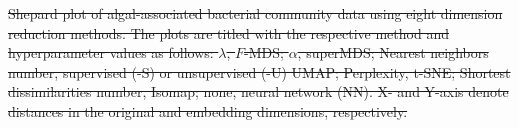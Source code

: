 \documentclass[11pt]{article}
\newcommand{\1}{{\rm 1}\kern-0.24em{\rm I}}
\providecommand{\DIFdeltex}[1]{{\protect\color{red}\sout{#1}}}                      %
\providecommand{\DIFdelbegin}{} %
\providecommand{\DIFdelend}{} %
\providecommand{\DIFdelFL}[1]{\DIFdel{#1}} %
\providecommand{\DIFdel}[1]{\texorpdfstring{\DIFdeltex{#1}}{}} %
\newcommand{\DIFscaledelfig}{0.5}
\newlength{\DIFdelgraphicswidth} %
\newlength{\DIFdelgraphicsheight} %
\newcommand{\DIFdelincludegraphics}[2][]{%
\sbox{\DIFdelgraphicsbox}{\DIFOincludegraphics[#1]{#2}}%
\settoboxwidth{\DIFdelgraphicswidth}{\DIFdelgraphicsbox} %
\settoboxtotalheight{\DIFdelgraphicsheight}{\DIFdelgraphicsbox} %
\scalebox{\DIFscaledelfig}{%
\parbox[b]{\DIFdelgraphicswidth}{\usebox{\DIFdelgraphicsbox}\\[-\baselineskip] \rule{\DIFdelgraphicswidth}{0em}}\llap{\resizebox{\DIFdelgraphicswidth}{\DIFdelgraphicsheight}{%
\setlength{\unitlength}{\DIFdelgraphicswidth}%
\begin{picture}(1,1)%
\thicklines\linethickness{2pt} %
{\color[rgb]{1,0,0}\put(0,0){\framebox(1,1){}}}%
{\color[rgb]{1,0,0}\put(0,0){\line( 1,1){1}}}%
{\color[rgb]{1,0,0}\put(0,1){\line(1,-1){1}}}%
\end{picture}%
}\hspace*{3pt}}} %
} %
\DeclareRobustCommand{\DIFdelbegin}{\DIFOdelbegin \let\includegraphics\DIFdelincludegraphics} %
\DeclareRobustCommand{\DIFdelend}{\DIFOaddend \let\includegraphics\DIFOincludegraphics} %
\begin{document}
\DIFdelbegin %
{%
\DIFdelFL{Shepard plot of algal-associated bacterial community data using eight dimension reduction methods. The plots are titled with the respective method and hyperparameter values as follows: $\lambda$, $F$-MDS; $\alpha$, superMDS; Nearest neighbors number, supervised (-S) or unsupervised (-U) UMAP; Perplexity, t-SNE; Shortest dissimilarities number, Isomap; none, neural network (NN). X- and Y-axis denote distances in the original and embedding dimensions, respectively.}}
\DIFdelend %
\end{document}
